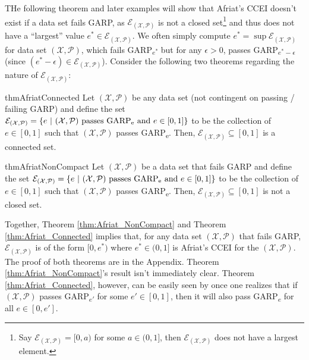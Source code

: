 \documentclass{article} %
\theoremstyle{style1}
\theoremstyle{example}
\begin{document}
THe following theorem and later examples will show that Afriat's CCEI doesn't exist if a data set fails GARP, as $\mathcal{E}_{(\mathcal{X},\mathcal{P})}$ is not a closed set\footnote{Say $\mathcal{E}_{(\mathcal{X},\mathcal{P})}=[0,a)$ for some $a\in(0,1]$, then $\mathcal{E}_{(\mathcal{X},\mathcal{P})}$ does not have a largest element.} and thus does not have a ``largest'' value $e^*\in\mathcal{E}_{(\mathcal{X},\mathcal{P})}$. We often simply compute $e^*=\sup \mathcal{E}_{(\mathcal{X},\mathcal{P})}$ for data set $(\mathcal{X},\mathcal{P})$, which fails GARP\textsubscript{$e^*$} but for any $\epsilon>0$, passes GARP\textsubscript{$e^*-\epsilon$} (since $(e^*-\epsilon)\in \mathcal{E}_{(\mathcal{X},\mathcal{P})}$). Consider the following two theorems regarding the nature of $\mathcal{E}_{(\mathcal{X},\mathcal{P})}$:

\begin{restatable}{thm}{AfriatConnected}\label{thm:Afriat_Connected}
Let $(\mathcal{X},\mathcal{P})$ be any data set (not contingent on passing / failing GARP) and define the set $\mathcal{E}_{(\mathcal{X},\mathcal{P})}=\{e\ |\ (\mathcal{X},\mathcal{P})\textrm{ passes GARP\textsubscript{e}}\textrm{ and } e\in[0,1]\}$ to be the collection of $e\in[0,1]$ such that $(\mathcal{X},\mathcal{P})$ passes GARP\textsubscript{e}. Then, $\mathcal{E}_{(\mathcal{X},\mathcal{P})}\subseteq[0,1]$ is a connected set.
\end{restatable}

\begin{restatable}{thm}{AfriatNonCompact}\label{thm:Afriat_NonCompact}
Let $(\mathcal{X},\mathcal{P})$ be a data set that fails GARP and define the set $\mathcal{E}_{(\mathcal{X},\mathcal{P})}=\{e\ |\ (\mathcal{X},\mathcal{P})\textrm{ passes GARP\textsubscript{e}}\textrm{ and } e\in[0,1]\}$ to be the collection of $e\in[0,1]$ such that $(\mathcal{X},\mathcal{P})$ passes GARP\textsubscript{e}. Then, $\mathcal{E}_{(\mathcal{X},\mathcal{P})}\subseteq[0,1]$ is not a closed set.
\end{restatable}

Together, Theorem \ref{thm:Afriat_NonCompact} and Theorem \ref{thm:Afriat_Connected} implies that, for any data set $(\mathcal{X},\mathcal{P})$ that fails GARP, $\mathcal{E}_{(\mathcal{X},\mathcal{P})}$ is of the form $[0,e^*)$ where $e^*\in(0,1]$ is Afriat's CCEI for the $(\mathcal{X},\mathcal{P})$. The proof of both theorems are in the Appendix. Theorem \ref{thm:Afriat_NonCompact}'s result isn't immediately clear. Theorem \ref{thm:Afriat_Connected}, however, can be easily seen by once one realizes that if $(\mathcal{X},\mathcal{P})$ passes GARP\textsubscript{$e'$} for some $e'\in[0,1]$, then it will also pass GARP\textsubscript{$e$} for all $e\in[0,e']$.
\end{document}
